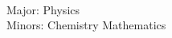 \begin{center}
	\begin{minipage}[b]{.2\textwidth}
	\raggedright
	{\large \phone} \\ %
	{\city} \\ %
	\href{mailto:\email}{\email} %
	\end{minipage}%
	\begin{minipage}[b]{.6\textwidth}
	\makeatletter
	\centering {\huge \@author} \\
	\makeatother
    \vspace{.7em}
    {\Large{\role}}
	\end{minipage}%
	\begin{minipage}[b]{.2\textwidth}
	\raggedleft 
	Major: Physics\\
	Minors: Chemistry
	Mathematics
	\end{minipage}

\end{center}
